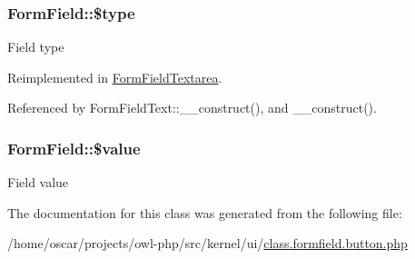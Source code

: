 \subsubsection[{\$type}]{\setlength{\rightskip}{0pt plus 5cm}FormField::\$type}\label{classFormField_a37bed21a1891e95be0e4a697e45ba51b}
Field type 

Reimplemented in \hyperlink{classFormFieldTextarea_a85348034822c70694fc8640bfcacc04d}{FormFieldTextarea}.



Referenced by FormFieldText::\_\-\_\-construct(), and \_\-\_\-construct().

\subsubsection[{\$value}]{\setlength{\rightskip}{0pt plus 5cm}FormField::\$value}\label{classFormField_a3c01e89834248eec8e2f145fbcfa0fbc}
Field value 

The documentation for this class was generated from the following file:\begin{DoxyCompactItemize}
\item 
/home/oscar/projects/owl-\/php/src/kernel/ui/\hyperlink{class_8formfield_8button_8php}{class.formfield.button.php}\end{DoxyCompactItemize}
